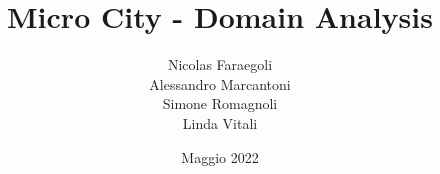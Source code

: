 \title{Micro City - Domain Analysis}
\author{Nicolas Faraegoli\\
Alessandro Marcantoni\\
Simone Romagnoli\\
Linda Vitali}
\date{Maggio 2022}
